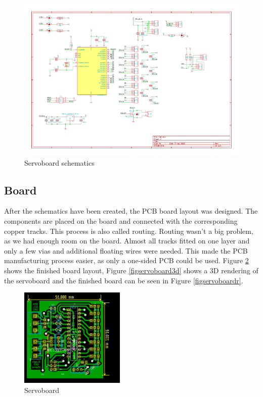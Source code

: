 \documentclass[12pt]{article}
\begin{document}
\begin{figure}[h]
\begin{center}
\includegraphics[width=20cm,angle=-90]{pic/servoboard}
\caption{Servoboard schematics}
\end{center}
\label{figservoboardscm}
\end{figure}

\subsection{Board}
After the schematics have been created, the PCB board layout was designed.
The components are placed on the board and connected with the corresponding copper tracks.
This process is also called routing.
Routing wasn't a big problem, as we had enough room on the board.
Almost all tracks fitted on one layer and only a few vias and additional floating wires were needed.
This made the PCB manufacturing process easier, as only a one-sided PCB could be used.
Figure \ref{figservoboardbrd} shows the finished board layout, Figure \ref{figservoboard3d} shows a 3D rendering of the servoboard and the finished board can be seen in Figure \ref{figservoboardr}.


\begin{figure}[h]
\begin{center}
\includegraphics[width=5cm]{pic/servoboardbrd.png}
\caption{Servoboard}
\end{center}
\label{figservoboardbrd}
\end{figure}
\end{document}
